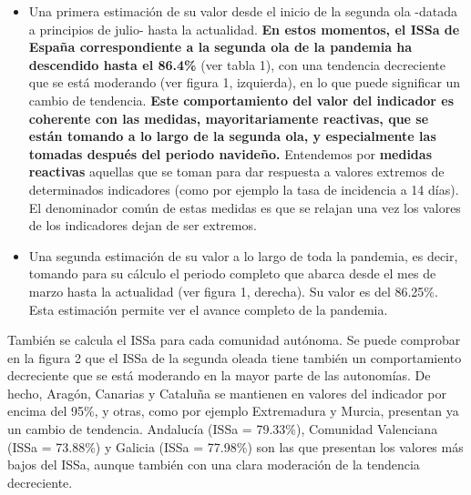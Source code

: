 \documentclass[
  11pt,
]{article}
\begin{document}
\begin{itemize}
\item
  Una primera estimación de su valor desde el inicio de la segunda ola
  -datada a principios de julio- hasta la actualidad. \textbf{En estos
  momentos, el ISSa de España correspondiente a la segunda ola de la
  pandemia ha descendido hasta el 86.4\%} (ver tabla 1), con una
  tendencia decreciente que se está moderando (ver figura 1, izquierda),
  en lo que puede significar un cambio de tendencia. \textbf{Este
  comportamiento del valor del indicador es coherente con las medidas,
  mayoritariamente reactivas, que se están tomando a lo largo de la
  segunda ola, y especialmente las tomadas después del periodo
  navideño.} Entendemos por \textbf{medidas reactivas} aquellas que se
  toman para dar respuesta a valores extremos de determinados
  indicadores (como por ejemplo la tasa de incidencia a 14 días). El
  denominador común de estas medidas es que se relajan una vez los
  valores de los indicadores dejan de ser extremos.
\item
  Una segunda estimación de su valor a lo largo de toda la pandemia, es
  decir, tomando para su cálculo el periodo completo que abarca desde el
  mes de marzo hasta la actualidad (ver figura 1, derecha). Su valor es
  del 86.25\%. Esta estimación permite ver el avance completo de la
  pandemia.
\end{itemize}

También se calcula el ISSa para cada comunidad autónoma. Se puede
comprobar en la figura 2 que el ISSa de la segunda oleada tiene también
un comportamiento decreciente que se está moderando en la mayor parte de
las autonomías. De hecho, Aragón, Canarias y Cataluña se mantienen en
valores del indicador por encima del 95\%, y otras, como por ejemplo
Extremadura y Murcia, presentan ya un cambio de tendencia. Andalucía
(ISSa = 79.33\%), Comunidad Valenciana (ISSa = 73.88\%) y Galicia (ISSa
= 77.98\%) son las que presentan los valores más bajos del ISSa, aunque
también con una clara moderación de la tendencia decreciente.
\end{document}
